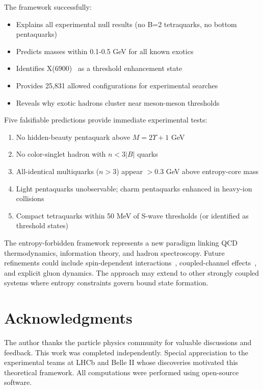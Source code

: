 \documentclass[12pt,a4paper]{article}
\begin{document}
The framework successfully:

\begin{itemize}
\item Explains all experimental null results (no B=2 tetraquarks, no bottom pentaquarks)
\item Predicts masses within 0.1-0.5 GeV for all known exotics
\item Identifies X(6900)~\cite{LHCb2020} as a threshold enhancement state
\item Provides 25,831 allowed configurations for experimental searches
\item Reveals why exotic hadrons cluster near meson-meson thresholds~\cite{Braaten2004}
\end{itemize}

Five falsifiable predictions provide immediate experimental tests:

\begin{enumerate}
\item No hidden-beauty pentaquark above $M = 2\Upsilon + 1$ GeV
\item No color-singlet hadron with $n < 3|B|$ quarks
\item All-identical multiquarks ($n>3$) appear $>0.3$ GeV above entropy-core mass
\item Light pentaquarks unobservable; charm pentaquarks enhanced in heavy-ion collisions
\item Compact tetraquarks within 50 MeV of S-wave thresholds (or identified as threshold states)
\end{enumerate}

The entropy-forbidden framework represents a new paradigm linking QCD thermodynamics, information theory, and hadron spectroscopy. Future refinements could include spin-dependent interactions~\cite{Esposito2017}, coupled-channel effects~\cite{Guo2018}, and explicit gluon dynamics. The approach may extend to other strongly coupled systems where entropy constraints govern bound state formation.

\section*{Acknowledgments}

The author thanks the particle physics community for valuable discussions and feedback. This work was completed independently. Special appreciation to the experimental teams at LHCb and Belle II whose discoveries motivated this theoretical framework. All computations were performed using open-source software.
\end{document}
